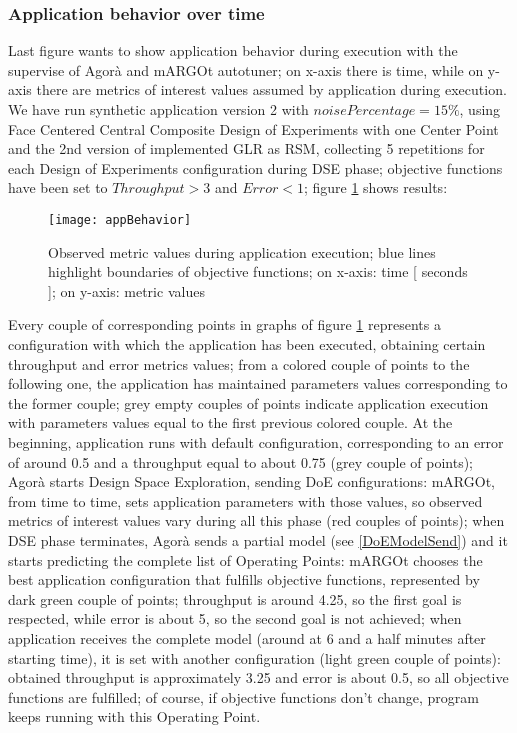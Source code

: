 \subsubsection{Application behavior over time}

Last figure wants to show application behavior during execution with the supervise of Agorà and mARGOt autotuner; on x-axis there is time, while on y-axis there are metrics of interest values assumed by application during execution. We have run synthetic application version 2 with $noisePercentage = 15\%$, using Face Centered Central Composite Design of Experiments with one Center Point and the 2nd version of implemented GLR as RSM, collecting 5 repetitions for each Design of Experiments configuration during DSE phase; objective functions have been set to $Throughput > 3$ and $Error < 1$; figure \ref{fig::appBeh} shows results:

\begin{figure}[H]

    \centering
    \texttt{[image: appBehavior]}
    \caption{Observed metric values during application execution; blue lines highlight boundaries of objective functions; on x-axis: time [ seconds ]; on y-axis: metric values}
    \label{fig::appBeh}
    
\end{figure}

Every couple of corresponding points in graphs of figure \ref{fig::appBeh} represents a configuration with which the application has been executed, obtaining certain throughput and error metrics values; from a colored couple of points to the following one, the application has maintained parameters values corresponding to the former couple; grey empty couples of points indicate application execution with parameters values equal to the first previous colored couple. At the beginning, application runs with default configuration, corresponding to an error of around 0.5 and a throughput equal to about 0.75 (grey couple of points); Agorà starts Design Space Exploration, sending DoE configurations: mARGOt, from time to time, sets application parameters with those values, so observed metrics of interest values vary during all this phase (red couples of points); when DSE phase terminates, Agorà sends a partial model (see \ref{DoEModelSend}) and it starts predicting the complete list of Operating Points: mARGOt chooses the best application configuration that fulfills objective functions, represented by dark green couple of points; throughput is around 4.25, so the first goal is respected, while error is about 5, so the second goal is not achieved; when application receives the complete model (around at 6 and a half minutes after starting time), it is set with another configuration (light green couple of points): obtained throughput is approximately 3.25 and error is about 0.5, so all objective functions are fulfilled; of course, if objective functions don't change, program keeps running with this Operating Point.




